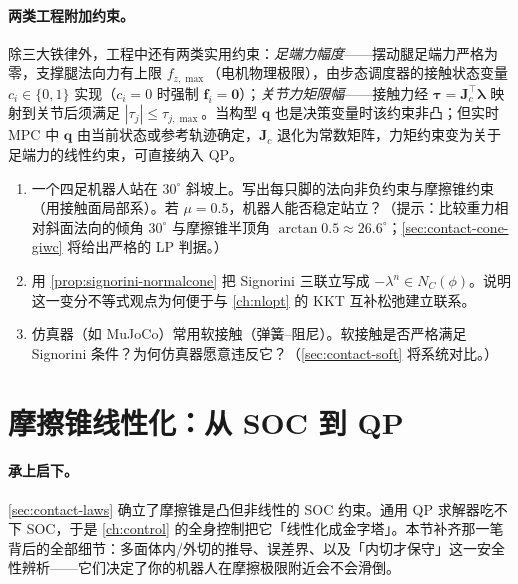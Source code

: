 \paragraph{两类工程附加约束。}
除三大铁律外，工程中还有两类实用约束：\emph{足端力幅度}——摆动腿足端力严格为零，支撑腿法向力有上限 $f_{z,\max}$（电机物理极限），由步态调度器的接触状态变量 $c_i\in\{0,1\}$ 实现（$c_i=0$ 时强制 $\boldsymbol{f}_i=\boldsymbol{0}$）；\emph{关节力矩限幅}——接触力经 $\boldsymbol{\tau}=\mathbf{J}_c^\top\boldsymbol{\lambda}$ 映射到关节后须满足 $|\tau_j|\le\tau_{j,\max}$。当构型 $\boldsymbol{q}$ 也是决策变量时该约束非凸；但实时 MPC 中 $\boldsymbol{q}$ 由当前状态或参考轨迹确定，$\mathbf{J}_c$ 退化为常数矩阵，力矩约束变为关于足端力的线性约束，可直接纳入 QP。

\begin{practice}
\begin{enumerate}
  \item 一个四足机器人站在 $30^\circ$ 斜坡上。写出每只脚的法向非负约束与摩擦锥约束（用接触面局部系）。若 $\mu=0.5$，机器人能否稳定站立？（提示：比较重力相对斜面法向的倾角 $30^\circ$ 与摩擦锥半顶角 $\arctan0.5\approx26.6^\circ$；\cref{sec:contact-cone-giwc} 将给出严格的 LP 判据。）
  \item 用 \cref{prop:signorini-normalcone} 把 Signorini 三联立写成 $-\lambda^n\in N_C(\phi)$。说明这一变分不等式观点为何便于与 \cref{ch:nlopt} 的 KKT 互补松弛建立联系。
  \item 仿真器（如 MuJoCo）常用软接触（弹簧--阻尼）。软接触是否严格满足 Signorini 条件？为何仿真器愿意违反它？（\cref{sec:contact-soft} 将系统对比。）
\end{enumerate}
\end{practice}

\section{摩擦锥线性化：从 SOC 到 QP}
\label{sec:contact-linearize}

\paragraph{承上启下。}
\cref{sec:contact-laws} 确立了摩擦锥是凸但非线性的 SOC 约束。通用 QP 求解器吃不下 SOC，于是 \cref{ch:control} 的全身控制把它「线性化成金字塔」。本节补齐那一笔背后的全部细节：多面体内/外切的推导、误差界、以及「内切才保守」这一安全性辨析——它们决定了你的机器人在摩擦极限附近会不会滑倒。

